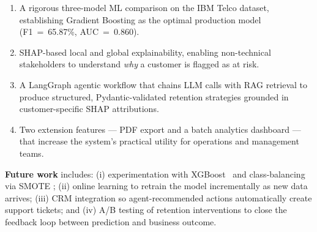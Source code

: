 \documentclass[conference]{IEEEtran}
\begin{document}
\begin{enumerate}
  \item A rigorous three-model ML comparison on the IBM Telco dataset,
        establishing Gradient Boosting as the optimal production model
        (F1~=~65.87\%, AUC~=~0.860).
  \item SHAP-based local and global explainability, enabling
        non-technical stakeholders to understand \textit{why} a customer
        is flagged as at risk.
  \item A LangGraph agentic workflow that chains LLM calls with RAG
        retrieval to produce structured, Pydantic-validated retention
        strategies grounded in customer-specific SHAP attributions.
  \item Two extension features — PDF export and a batch analytics
        dashboard — that increase the system's practical utility for
        operations and management teams.
\end{enumerate}

\textbf{Future work} includes: (i) experimentation with
XGBoost~\cite{chen2016xgboost} and class-balancing via SMOTE
\cite{chawla2002smote}; (ii) online learning to retrain the model
incrementally as new data arrives; (iii) CRM integration so
agent-recommended actions automatically create support tickets; and
(iv) A/B testing of retention interventions to close the feedback loop
between prediction and business outcome.


\end{document}
